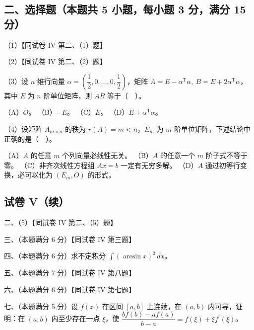 \documentclass[UTF8,12pt]{ctexart}
\begin{document}
\subsection*{二、选择题（本题共 5 小题，每小题 3 分，满分 15 分）}

（1）【同试卷 IV 第二、（1）题】


（2）【同试卷 IV 第二、（2）题】


（3）设 \(\displaystyle n\) 维行向量 \(\displaystyle \alpha=(\dfrac{\displaystyle 1}{\displaystyle 2},\allowbreak 0,\allowbreak \ldots,\allowbreak 0,\allowbreak \dfrac{\displaystyle 1}{\displaystyle 2})\)，矩阵 \(\displaystyle A=E-\alpha^{\mathrm T}\alpha,\allowbreak \ B=E+2\alpha^{\mathrm T}\alpha\)，其中 \(\displaystyle E\) 为 \(\displaystyle n\) 阶单位矩阵，则 \(\displaystyle AB\) 等于（　）。


（A）\(\displaystyle O\)。 （B）\(\displaystyle -E\)。 （C）\(\displaystyle E\)。 （D）\(\displaystyle E+\alpha^{\mathrm T}\alpha\)。


（4）设矩阵 \(\displaystyle A_{m\times n}\) 的秩为 \(\displaystyle r(A)=m<n\)，\(\displaystyle E_m\) 为 \(\displaystyle m\) 阶单位矩阵，下述结论中正确的是（　）。


（A）\(\displaystyle A\) 的任意 \(\displaystyle m\) 个列向量必线性无关。 （B）\(\displaystyle A\) 的任意一个 \(\displaystyle m\) 阶子式不等于零。 （C）非齐次线性方程组 \(\displaystyle Ax=b\) 一定有无穷多解。 （D）\(\displaystyle A\) 通过初等行变换，必可以化为 \(\displaystyle (E_m,\allowbreak O)\) 的形式。


\subsection*{试卷 V（续）}

二、（5）【同试卷 IV 第二、（5）题】


三、（本题满分 6 分）【同试卷 IV 第三题】


四、（本题满分 6 分）求不定积分 \(\displaystyle \int(\arcsin x)^2\,dx\)。


五、（本题满分 7 分）【同试卷 IV 第八题】


六、（本题满分 6 分）【同试卷 IV 第七题】


七、（本题满分 5 分）设 \(\displaystyle f(x)\) 在区间 \(\displaystyle [a,\allowbreak b]\) 上连续，在 \(\displaystyle (a,\allowbreak b)\) 内可导，证明：在 \(\displaystyle (a,\allowbreak b)\) 内至少存在一点 \(\displaystyle \xi\)，使 \(\displaystyle \dfrac{\displaystyle bf(b)-af(a)}{\displaystyle b-a}=f(\xi)+\xi f^{\prime}(\xi)\)。
\end{document}
